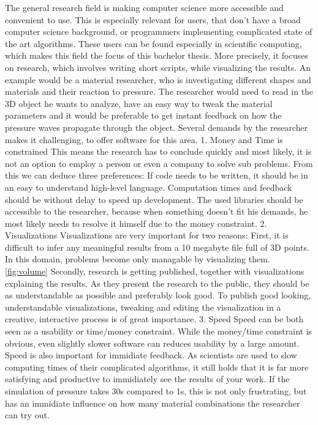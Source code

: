 The general research field is making computer science more accessible and convenient to use. This is especially relevant for users, that don't have a broad computer science background, or programmers implementing complicated state of the art algorithms.
These users can be found especially in scientific computing, which makes this field the focus of this bachelor thesis. 
More precisely, it focuses on research, which involves writing short scripts, while visualizing the results. 
An example would be a material researcher, who is investigating different shapes and materials and their reaction to pressure.
The researcher would need to read in the 3D object he wants to analyze, have an easy way to tweak the material parameters and it would be preferable to get instant feedback on how the pressure waves propagate through the object. 
Several demands by the researcher makes it challenging, to offer software for this area.
1. Money and Time is constrained
This means the research has to conclude quickly and most likely, it is not an option to employ a person or even a company to solve sub problems.
From this we can deduce three preferences: If code needs to be written, it should be in an easy to understand high-level language. Computation times and feedback should be without delay to speed up development. The used libraries should be accessible to the researcher, because when something doesn't fit his demands, he most likely needs to resolve it himself due to the money constraint.
2. Visualizations
Visualizations are very important for two reasons:
First, it is difficult to infer any meaningful results from a 10 megabyte file full of 3D points. In this domain, problems become only managable by visualizing them. \ref{fig:volume}
Secondly, research is getting published, together with visualizations explaining the results. As they present the research to the public, they should be as understandable as possible and preferably look good.
To publish good looking, understandable visualizations, tweaking and editing the visualization in a creative, interactive process is of great importance.
3. Speed
Speed can be both seen as a usability or time/money constraint. While the money/time constraint is obvious, even slightly slower software can reduces usability by a large amount.
Speed is also important for immidiate feedback. As scientists are used to slow computing times of their complicated algorithms, it still holds that it is far more satisfying and productive to immidiately see the results of your work. If the simulation of pressure takes 30s compared to 1s, this is not only frustrating, but has an immidiate influence on how many material combinations the researcher can try out.


